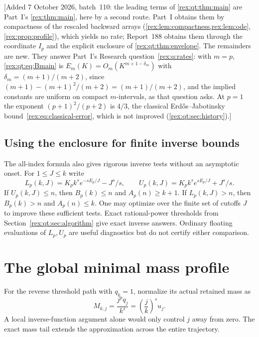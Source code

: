[Added 7 October 2026, batch~110: the leading terms of
\cref{rex:qt:thm:main} are Part~I's \cref{rex:thm:main}, here by a second
route. Part~I obtains them by compactness of the rescaled backward arrays
(\cref{rex:lem:compactness,rex:lem:ode}, \cref{rex:prop:profile}), which
yields no rate; Report~188 obtains them through the coordinate $I_p$ and
the explicit enclosure of \cref{rex:qt:thm:envelope}. The remainders are
new. They answer Part~I's Research question~\ref{rex:q:rates}: with
$m=p$, \eqref{rex:qt:eq:Bmain} is $E_m(K)=O_m(K^{m+1-\delta_m})$ with
$\delta_m=(m+1)/(m+2)$, since
$(m+1)-(m+1)^2/(m+2)=(m+1)/(m+2)$, and the implied constants are uniform
on compact $m$-intervals, as that question asks. At $p=1$ the exponent
$(p+1)^2/(p+2)$ is $4/3$, the classical Erd\H{o}s--Jabotinsky
bound~\eqref{rex:eq:classical-error}, which is not improved
(\cref{rex:qt:sec:history}).]

\subsection{Using the enclosure for finite inverse bounds}
The all-index formula also gives rigorous inverse tests without an asymptotic onset. For $1\le J\le k$ write
\[
 L_p(k,J)=K_p k^s e^{-sE_p/J}-J^s/s,\qquad
 U_p(k,J)=K_p k^s e^{sE_p/J}+J^s/s.
\]
If $U_p(k,J)\le n$, then $B_p(k)\le n$ and $A_p(n)\ge k+1$. If $L_p(k,J)>n$, then $B_p(k)>n$ and $A_p(n)\le k$. One may optimize over the finite set of cutoffs $J$ to improve these sufficient tests. Exact rational-power thresholds from Section~\ref{rex:qt:sec:algorithm} give exact inverse answers. Ordinary floating evaluations of $L_p,U_p$ are useful diagnostics but do not certify either comparison.

\section{The global minimal mass profile}\label{rex:qt:sec:global}
For the reverse threshold path with $q_k=1$, normalize its actual retained mass as
\begin{equation}\label{rex:qt:eq:Mnormalized}
 M_{k,j}=\frac{j^p q_j}{k^s}=\left(\frac jk\right)^s u_j.
\end{equation}
A local inverse-function argument alone would only control $j$ away from zero. The exact mass tail extends the approximation across the entire trajectory.

